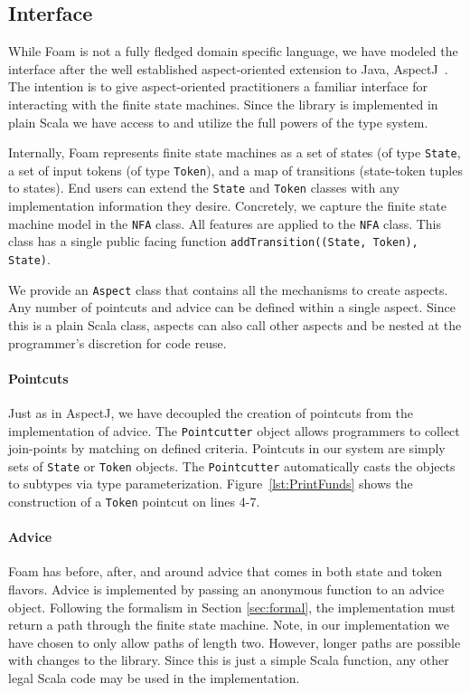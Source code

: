 \documentclass[sigplan,anonymous,review]{acmart}
\begin{document}
\subsection{Interface}
While Foam is not a fully fledged domain specific language, we have modeled the interface after the well established aspect-oriented extension to Java, AspectJ~\cite{}. The intention is to give aspect-oriented practitioners a familiar interface for interacting with the finite state machines. Since the library is implemented in plain Scala we have access to and utilize the full powers of the type system. 

Internally, Foam represents finite state machines as a set of states (of type \texttt{State}, a set of input tokens (of type \texttt{Token}), and a map of transitions (state-token tuples to states). End users can extend the \texttt{State} and \texttt{Token} classes with any implementation information they desire. Concretely, we capture the finite state machine model in the \texttt{NFA} class. All features are applied to the \texttt{NFA} class. This class has a single public facing function \texttt{addTransition((State, Token), State)}.

We provide an \texttt{Aspect} class that contains all the mechanisms to create aspects. Any number of pointcuts and advice can be defined within a single aspect. Since this is a plain Scala class, aspects can also call other aspects and be nested at the programmer's discretion for code reuse.

\paragraph{Pointcuts} Just as in AspectJ, we have decoupled the creation of pointcuts from the implementation of advice. The \texttt{Pointcutter} object allows programmers to collect join-points by matching on defined criteria. Pointcuts in our system are simply sets of \texttt{State} or \texttt{Token} objects. The \texttt{Pointcutter} automatically casts the objects to subtypes via type parameterization. Figure~\ref{lst:PrintFunds} shows the construction of a \texttt{Token} pointcut on lines 4-7.

\paragraph{Advice} Foam has before, after, and around advice that comes in both state and token flavors. Advice is implemented by passing an anonymous function to an advice object. Following the formalism in Section \ref{sec:formal}, the implementation must return a path through the finite state machine. Note, in our implementation we have chosen to only allow paths of length two. However, longer paths are possible with changes to the library. Since this is just a simple Scala function, any other legal Scala code may be used in the implementation. 
\end{document}
